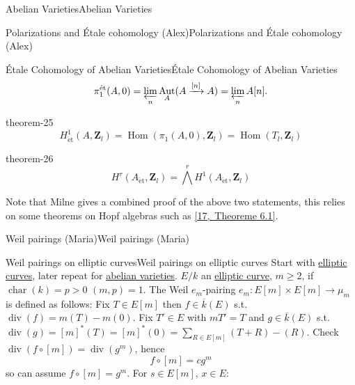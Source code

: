 \documentclass[10pt,]{book}
\numberwithin{equation}{section}
\newcommand{\lb}{[}
\newcommand{\rb}{]}
\newcommand{\ZZ}{\mathbf{Z}}
\newcommand{\et}{\mathrm{\acute{e}t}}
\DeclareMathOperator{\Hom}{Hom}
\DeclareMathOperator{\divisor}{div}
\DeclareMathOperator{\characteristic}{char}
\DeclareMathOperator{\Aut}{Aut}
\newcommand{\gt}{>}
\begin{document}
\begin{chapterptx}{Abelian Varieties}{}{Abelian Varieties}{}{}
\begin{sectionptx}{Polarizations and Étale cohomology (Alex)}{}{Polarizations and Étale cohomology (Alex)}{}{}
\begin{subsectionptx}{Étale Cohomology of Abelian Varieties}{}{Étale Cohomology of Abelian Varieties}{}{}
\begin{equation*}
\pi_1^\et(A,0) =\varprojlim_n \Aut_A(A\xrightarrow{[n]} A)=  \varprojlim_n A[n]\text{.}
\end{equation*}
%
\begin{theorem}{}{}{theorem-25}%
\hypertarget{p-296}{}%
%
\begin{equation*}
H^1_\et(A , \ZZ_l) = \Hom(\pi_1(A,0), \ZZ_l) = \Hom(T_l,\ZZ_l)
\end{equation*}
%
\end{theorem}
\begin{theorem}{}{}{theorem-26}%
\hypertarget{p-297}{}%
%
\begin{equation*}
H^r(A_\et, \ZZ_l) = \bigwedge^r H^1(A_\et, \ZZ_l)
\end{equation*}
%
\end{theorem}
\hypertarget{p-298}{}%
Note that Milne gives a combined proof of the above two statements, this relies on some theorems on Hopf algebras such as \hyperlink{bib-borel-hopf}{[17,~Theoreme 6.1]}.%
\end{subsectionptx}
\end{sectionptx}
%
%
\typeout{************************************************}
\typeout{************************************************}
%
\begin{sectionptx}{Weil pairings (Maria)}{}{Weil pairings (Maria)}{}{}\label{sec-weil-pairings}
%
%
\typeout{************************************************}
\typeout{************************************************}
%
\begin{subsectionptx}{Weil pairings on elliptic curves}{}{Weil pairings on elliptic curves}{}{}\label{subsection-28}
\hypertarget{p-299}{}%
Start with \hyperref[def-supersing-isog-ec]{elliptic curves}, later repeat for \hyperref[def-buntes-abvar]{abelian varieties}. \(E/k\) an \hyperref[def-supersing-isog-ec]{elliptic curve}, \(m\ge 2\), if \(\characteristic(k) = p \gt 0\) \((m,p) = 1\). The Weil \(e_m\)-pairing \(e_m \colon E\lb m\rb \times E\lb m \rb \to \mu_m\) is defined as follows: Fix \(T\in E\lb m \rb\) then \(f\in \overline  k (E)\) s.t. \(\divisor(f) = m(T) - m(0)\). Fix \(T' \in E\) with \(mT' = T\) and \(g\in \overline k(E)\) s.t. \(\divisor(g) = \lb m \rb^*(T) = \lb m \rb^*(0)= \sum_{R\in E\lb m \rb} (T+R) - (R)\). Check \(\divisor (f\circ \lb m \rb) = \divisor(g^m)\), hence%
\begin{equation*}
f\circ [m] = c g^m
\end{equation*}
so can assume \(f\circ \lb m \rb = g^m\). For \(s \in E\lb m \rb\), \(x\in E\):%

\end{subsectionptx}
\end{sectionptx}
\end{chapterptx}
\end{document}

